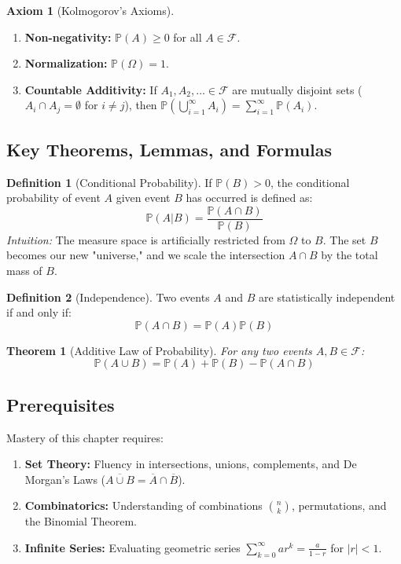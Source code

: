 \documentclass[12pt]{article}
\newtheorem{theorem}{Theorem}[section]
\theoremstyle{definition}
\newtheorem{definition}{Definition}[section]
\newtheorem{axiom}{Axiom}[section]
\theoremstyle{remark}
\begin{document}
\begin{axiom}[Kolmogorov's Axioms]
    \begin{enumerate}
        \item \textbf{Non-negativity:} $\mathbb{P}(A) \ge 0$ for all $A \in \mathcal{F}$.
        \item \textbf{Normalization:} $\mathbb{P}(\Omega) = 1$.
        \item \textbf{Countable Additivity:} If $A_1, A_2, \dots \in \mathcal{F}$ are mutually disjoint sets ($A_i \cap A_j = \emptyset$ for $i \neq j$), then $\mathbb{P}\left(\bigcup_{i=1}^\infty A_i\right) = \sum_{i=1}^\infty \mathbb{P}(A_i)$.
    \end{enumerate}
\end{axiom}

\subsection{Key Theorems, Lemmas, and Formulas}
\begin{definition}[Conditional Probability]
If $\mathbb{P}(B) > 0$, the conditional probability of event $A$ given event $B$ has occurred is defined as:
\[ \mathbb{P}(A|B) = \frac{\mathbb{P}(A \cap B)}{\mathbb{P}(B)} \]
\textit{Intuition:} The measure space is artificially restricted from $\Omega$ to $B$. The set $B$ becomes our new "universe," and we scale the intersection $A \cap B$ by the total mass of $B$.
\end{definition}

\begin{definition}[Independence]
Two events $A$ and $B$ are statistically independent if and only if:
\[ \mathbb{P}(A \cap B) = \mathbb{P}(A)\mathbb{P}(B) \]
\end{definition}

\begin{theorem}[Additive Law of Probability]
For any two events $A, B \in \mathcal{F}$:
\[ \mathbb{P}(A \cup B) = \mathbb{P}(A) + \mathbb{P}(B) - \mathbb{P}(A \cap B) \]
\end{theorem}

\subsection{Prerequisites}
Mastery of this chapter requires:
\begin{enumerate}
    \item \textbf{Set Theory:} Fluency in intersections, unions, complements, and De Morgan's Laws ($\overline{A \cup B} = \overline{A} \cap \overline{B}$).
    \item \textbf{Combinatorics:} Understanding of combinations $\binom{n}{k}$, permutations, and the Binomial Theorem.
    \item \textbf{Infinite Series:} Evaluating geometric series $\sum_{k=0}^\infty a r^k = \frac{a}{1-r}$ for $|r| < 1$.
\end{enumerate}
\end{document}
